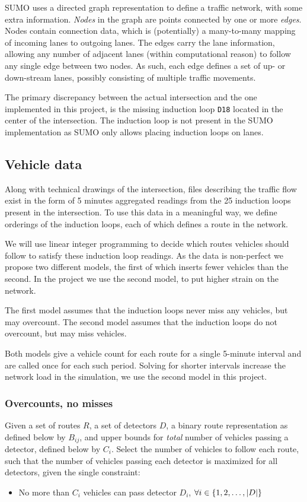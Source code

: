 SUMO uses a directed graph representation to define a traffic network, with some extra information. 
\textit{Nodes} in the graph are points connected by one or more \textit{edges}. Nodes contain connection data, which is (potentially) a many-to-many mapping of incoming lanes to outgoing lanes. The edges carry the lane information, allowing any number of adjacent lanes (within computational reason) to follow any single edge between two nodes. As such, each edge defines a set of up- or down-stream lanes, possibly consisting of multiple traffic movements.

The primary discrepancy between the actual intersection and the one implemented in this project, is the missing induction loop \texttt{D18} located in the center of the intersection. 
The induction loop is not present in the SUMO implementation as SUMO only allows placing induction loops on lanes.

\subsection{Vehicle data}

Along with technical drawings of the intersection, files describing the traffic flow exist in the form of 5 minutes aggregated readings from the 25 induction loops present in the intersection.
To use this data in a meaningful way, we define orderings of the induction loops, each of which defines a route in the network. 

We will use linear integer programming to decide which routes vehicles should follow to satisfy these induction loop readings. As the data is non-perfect we propose two different models, the first of which inserts fewer vehicles than the second. In the project we use the second model, to put higher strain on the network.

The first model assumes that the induction loops never miss any vehicles, but may overcount.
The second model assumes that the induction loops do not overcount, but may miss vehicles. 

Both models give a vehicle count for each route for a single 5-minute interval and are called once for each such period.
Solving for shorter intervals increase the network load in the simulation, we use the second model in this project.

\subsubsection{Overcounts, no misses}
Given a set of routes $R$, a set of detectors $D$, a binary route representation as defined below by $B_{ij}$, and upper bounds for \textit{total} number of vehicles passing a detector, defined below by $C_i$. 
Select the number of vehicles to follow each route, such that the number of vehicles passing each detector is maximized for all detectors, given the single constraint:
\begin{itemize}
  \item No more than $C_i$ vehicles can pass detector $D_i$, $\forall i \in \left\{1, 2, \ldots, |D|\right\}$
\end{itemize}

